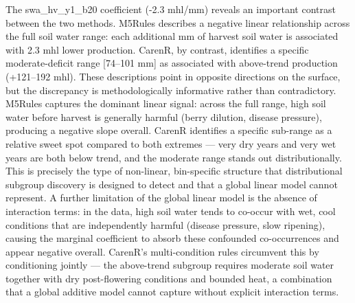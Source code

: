The swa\_hv\_y1\_b20 coefficient (-2.3 mhl/mm) reveals an important contrast between the two methods. M5Rules describes a negative linear relationship across the full soil water range: each additional mm of harvest soil water is associated with 2.3 mhl lower production. CarenR, by contrast, identifies a specific moderate-deficit range [74--101 mm] as associated with above-trend production (+121--192 mhl). These descriptions point in opposite directions on the surface, but the discrepancy is methodologically informative rather than contradictory. M5Rules captures the dominant linear signal: across the full range, high soil water before harvest is generally harmful (berry dilution, disease pressure), producing a negative slope overall. CarenR identifies a specific sub-range as a relative sweet spot compared to both extremes --- very dry years and very wet years are both below trend, and the moderate range stands out distributionally. This is precisely the type of non-linear, bin-specific structure that distributional subgroup discovery is designed to detect and that a global linear model cannot represent. A further limitation of the global linear model is the absence of interaction terms: in the data, high soil water tends to co-occur with wet, cool conditions that are independently harmful (disease pressure, slow ripening), causing the marginal coefficient to absorb these confounded co-occurrences and appear negative overall. CarenR's multi-condition rules circumvent this by conditioning jointly --- the above-trend subgroup requires moderate soil water together with dry post-flowering conditions and bounded heat, a combination that a global additive model cannot capture without explicit interaction terms.

